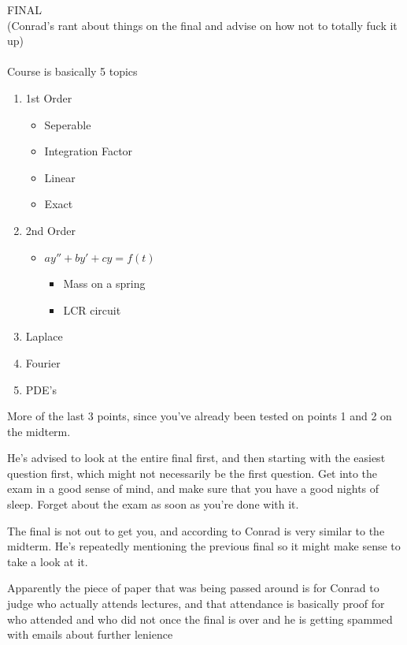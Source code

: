 \documentclass[11pt]{article}
\theoremstyle{definition}
\begin{document}
{\LARGE FINAL \\ \large(Conrad's rant about things on the final and advise on how not to totally fuck it up)}\\
\\
Course is basically 5 topics
\begin{enumerate}[noitemsep, topsep=-10pt]
    \item 1st Order
    \begin{itemize}[noitemsep]
        \item Seperable
        \item Integration Factor
        \item Linear
        \item Exact
    \end{itemize}
    \item 2nd Order
    \begin{itemize}[noitemsep]
        \item $ay'' + by' + cy = f(t)$
        \begin{itemize}[noitemsep]
            \item Mass on a spring
            \item LCR circuit
        \end{itemize}
    \end{itemize}
    \item Laplace
    \item Fourier
    \item PDE's
\end{enumerate}
More of the last 3 points, since you've already been tested on points 1 and 2 on the midterm.

He's advised to look at the entire final first, and then starting with the easiest question first, which might not necessarily be the first question. Get into the exam in a good sense of mind, and make sure that you have a good nights of sleep. Forget about the exam as soon as you're done with it.

The final is not out to get you, and according to Conrad is very similar to the midterm. He's repeatedly mentioning the previous final so it might make sense to take a look at it.

Apparently the piece of paper that was being passed around is for Conrad to judge who actually attends lectures, and that attendance is basically proof for who attended and who did not once the final is over and he is getting spammed with emails about further lenience
\newpage
\end{document}
